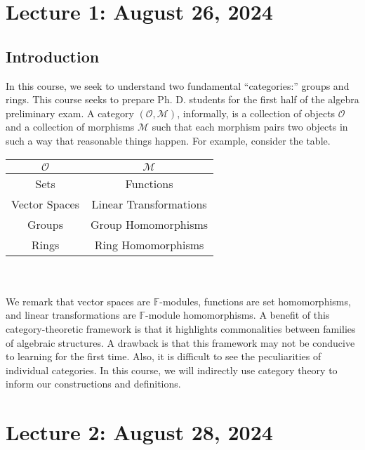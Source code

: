 \section{Lecture 1: August 26, 2024}

    \subsection{Introduction}

        In this course, we seek to understand two fundamental ``categories:'' groups and rings. This course seeks to prepare Ph. D. students for the first half of the algebra preliminary exam. A category \((\mathcal{O},\mathcal{M})\), informally, is a collection of objects \(\mathcal{O}\) and a collection of morphisms \(\mathcal{M}\) such that each morphism pairs two objects in such a way that reasonable things happen. For example, consider the table.
        \begin{center}
            \begin{tabular}{cc}
                \hline
                \(\mathcal{O}\) & \(\mathcal{M}\) \\
                \hline
                Sets & Functions \\
                Vector Spaces & Linear Transformations \\
                Groups & Group Homomorphisms \\
                Rings & Ring Homomorphisms \\
                \hline
            \end{tabular}
        \end{center}
        \vphantom
        \\
        \\
        We remark that vector spaces are \(\mathbb{F}\)-modules, functions are set homomorphisms, and linear transformations are \(\mathbb{F}\)-module homomorphisms. A benefit of this category-theoretic framework is that it highlights commonalities between families of algebraic structures. A drawback is that this framework may not be conducive to learning for the first time. Also, it is difficult to see the peculiarities of individual categories. In this course, we will indirectly use category theory to inform our constructions and definitions.

\pagebreak

\section{Lecture 2: August 28, 2024}


